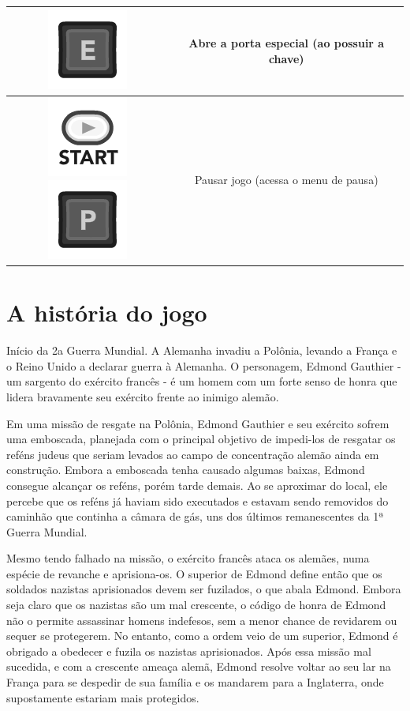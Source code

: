 \documentclass[12pt]{article}
\begin{document}
\begin{longtable}{|c|c|}
\includegraphics[scale=0.3]{images/kE.png}
& Abre a porta especial (ao possuir a chave) 
\\
\hline
\includegraphics[scale=0.3]{images/360_Start.png}
\includegraphics[scale=0.3]{images/kP.png}
& Pausar jogo (acessa o menu de pausa)
\\
\hline
\end{longtable}

\section{A história do jogo}

   Início da 2a Guerra Mundial. A Alemanha invadiu a Polônia, levando a França e o Reino Unido a declarar guerra à Alemanha. O personagem, Edmond Gauthier - um sargento do exército francês - é um homem com um forte senso de honra que lidera bravamente seu exército frente ao inimigo alemão.
   
Em uma missão de resgate na Polônia, Edmond Gauthier e seu exército sofrem uma emboscada, planejada com o principal objetivo de impedi-los de resgatar os reféns judeus que seriam levados ao campo de concentração alemão ainda em construção. Embora a emboscada tenha causado algumas baixas, Edmond consegue alcançar os reféns, porém tarde demais. Ao se aproximar do local, ele percebe que os reféns já haviam sido executados e estavam sendo removidos do caminhão que continha a câmara de gás, uns dos últimos remanescentes da 1ª Guerra Mundial.
   
    Mesmo tendo falhado na missão, o exército francês ataca os alemães, numa espécie de revanche e  aprisiona-os. O superior de Edmond define então que os soldados nazistas aprisionados devem ser fuzilados, o que abala Edmond. Embora seja claro que os nazistas são um mal crescente, o código de honra de Edmond não o permite assassinar homens indefesos, sem a menor chance de revidarem ou sequer se protegerem. No entanto, como a ordem veio de um superior, Edmond é obrigado a obedecer e fuzila os nazistas aprisionados. Após essa missão mal sucedida, e com a crescente ameaça alemã, Edmond resolve voltar ao seu lar na França para se despedir de sua família e os mandarem para a Inglaterra, onde supostamente estariam mais protegidos.
    
\end{document}
